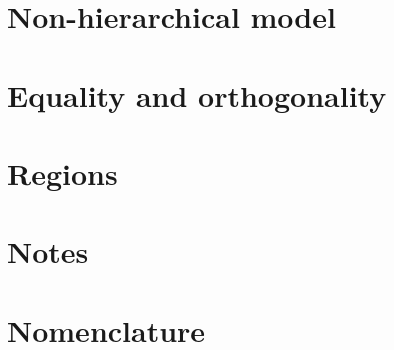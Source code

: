 \documentclass[preprint,12pt]{elsarticle}
\begin{document}
% 

\section{Non-hierarchical model} \label{sec:Non_Hierarchical}


% 

\section{Equality and orthogonality} \label{sec:Eq_Orth}


\section{Regions} \label{sec:Regions}


\section{Notes} \label{sec:Notes}


\clearpage
\section{Nomenclature} \label{sec:Nomenclature}



 

\end{document}
